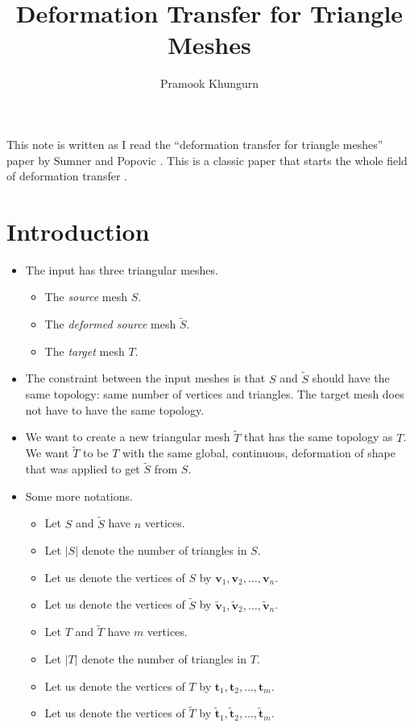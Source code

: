 \documentclass[10pt]{article}
\title{Deformation Transfer for Triangle Meshes}
\author{Pramook Khungurn}
\newcommand{\ve}[1]{\mathbf{#1}}
\begin{document}
\maketitle

This note is written as I read the ``deformation transfer for triangle meshes'' paper by Sumner and Popovic \cite{Sumner:2004}. This is a classic paper that starts the whole field of deformation transfer \cite{Roberts:2021:Survey}.

\section{Introduction}

\begin{itemize}
    \item The input has three triangular meshes.
    \begin{itemize}
        \item The \emph{source} mesh $S$.
        \item The \emph{deformed source} mesh $\widetilde{S}$.
        \item The \emph{target} mesh $T$.
    \end{itemize}
    
    \item The constraint between the input meshes is that $S$ and $\widetilde{S}$ should have the same topology: same number of vertices and triangles. The target mesh does not have to have the same topology.
    
    \item We want to create a new triangular mesh $\widetilde{T}$ that has the same topology as $T$. We want $\widetilde{T}$ to be $T$ with the same global, continuous, deformation of shape that was applied to get $\widetilde{S}$ from $S$.
    
    \item Some more notations.
    \begin{itemize}
        \item Let $S$ and $\widetilde{S}$ have $n$ vertices. 
        \item Let $|S|$ denote the number of triangles in $S$.
        \item Let us denote the vertices of $S$ by $\ve{v}_1, \ve{v}_2, \ldots, \ve{v}_n$.
        \item Let us denote the vertices of $\widetilde{S}$ by $\widetilde{\ve{v}}_1, \widetilde{\ve{v}}_2, \ldots, \widetilde{\ve{v}}_n$.
        \item Let $T$ and $\widetilde{T}$ have $m$ vertices.
        \item Let $|T|$ denote the number of triangles in $T$.
        \item Let us denote the vertices of $T$ by $\ve{t}_1, \ve{t}_2, \ldots, \ve{t}_m$.
        \item Let us denote the vertices of $\widetilde{T}$ by $\widetilde{\ve{t}}_1, \widetilde{\ve{t}}_2, \ldots, \widetilde{\ve{t}}_m$.
    \end{itemize}
     

\end{itemize}
\end{document}
